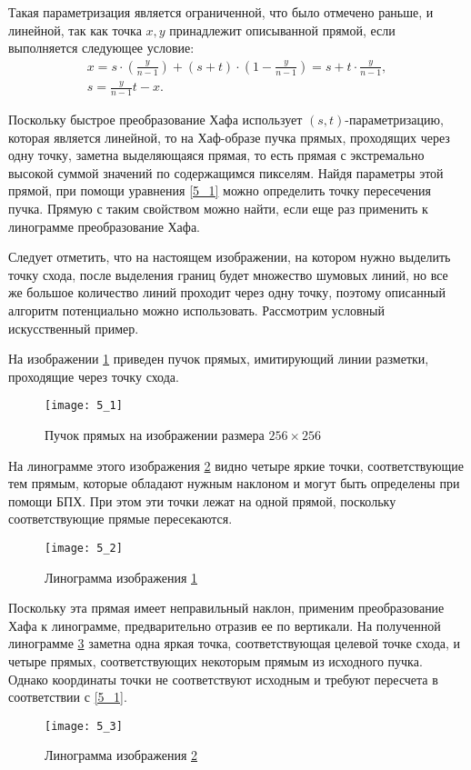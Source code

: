 \begin{itemize}
    Такая параметризация является ограниченной, что было отмечено раньше, и линейной, так как точка $x, y$ принадлежит описыванной прямой, если выполняется следующее условие:
    \begin{gather}
    \label{5_1}
        x =
        s \cdot \left( \frac{y}{n-1} \right) + \left( s+t \right) \cdot \left( 1 - \frac{y}{n-1} \right) =
        s + t \cdot \frac{y}{n-1}, \\
    \nonumber
        s = \frac{y}{n-1} t - x.
    \end{gather}
\end{itemize}

Поскольку быстрое преобразование Хафа использует $(s, t)$-параметризацию, которая является линейной, то на Хаф-образе пучка прямых, проходящих через одну точку, заметна выделяющаяся прямая, то есть прямая с экстремально высокой суммой значений по содержащимся пикселям. Найдя параметры этой прямой, при помощи уравнения \eqref{5_1} можно определить точку пересечения пучка. Прямую с таким свойством можно найти, если еще раз применить к линограмме преобразование Хафа.

Следует отметить, что на настоящем изображении, на котором нужно выделить точку схода, после выделения границ будет множество шумовых линий, но все же большое количество линий проходит через одну точку, поэтому описанный алгоритм потенциально можно использовать. Рассмотрим условный искусственный пример.

На изображении \ref{img5_1} приведен пучок прямых, имитирующий линии разметки, проходящие через точку схода.

\begin{figure}[!h]
    \centering
    \texttt{[image: 5\_1]}
    \caption{Пучок прямых на изображении размера $256 \times 256$}
    \label{img5_1}
\end{figure}

На линограмме этого изображения \ref{img5_2} видно четыре яркие точки, соответствующие тем прямым, которые обладают нужным наклоном и могут быть определены при помощи БПХ. При этом эти точки лежат на одной прямой, поскольку соответствующие прямые пересекаются.

\begin{figure}[!h]
    \centering
    \texttt{[image: 5\_2]}
    \caption{Линограмма изображения \ref{img5_1}}
    \label{img5_2}
\end{figure}

Поскольку эта прямая имеет неправильный наклон, применим преобразование Хафа к линограмме, предварительно отразив ее по вертикали. На полученной линограмме \ref{img5_3} заметна одна яркая точка, соответствующая целевой точке схода, и четыре прямых, соответствующих некоторым прямым из исходного пучка. Однако координаты точки не соответствуют исходным и требуют пересчета в соответствии с \eqref{5_1}.

\begin{figure}[!h]
    \centering
    \texttt{[image: 5\_3]}
    \caption{Линограмма изображения \ref{img5_2}}
    \label{img5_3}
\end{figure}
